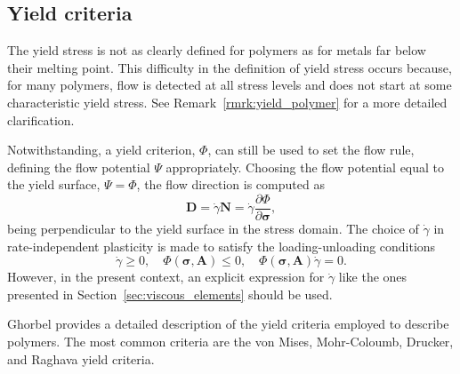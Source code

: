 
\subsection{Yield criteria}
\label{sec:yield_criteria}

The yield stress is not as clearly defined for polymers as for metals far below their melting point.
This difficulty in the definition of yield stress occurs because, for many polymers, flow is detected at all stress levels and does not start at some characteristic yield stress.
See Remark~\ref{rmrk:yield_polymer} for a more detailed clarification.

Notwithstanding, a yield criterion, $\Phi$, can still be used to set the flow rule, defining the flow potential $\Psi$ appropriately.
Choosing the flow potential equal to the yield surface, $\Psi = \Phi$, the flow direction is computed as
\begin{equation}
	\bm D = \dot \gamma \bm N = \dot \gamma \frac{\partial \Phi}{\partial \bm \sigma},
\end{equation}
being perpendicular to the yield surface in the stress domain.
The choice of $\dot \gamma$ in rate-independent plasticity is made to satisfy the loading-unloading conditions
\begin{equation}
	\dot\gamma \geq 0,\quad \Phi(\bm \sigma, \bm A) \leq 0,\quad \Phi(\bm \sigma, \bm A) \dot \gamma = 0.
\end{equation}
However, in the present context, an explicit expression for $\dot \gamma$ like the ones presented in Section~\ref{sec:viscous_elements} should be used.

Ghorbel \citep{ghorbelViscoplasticConstitutiveModel2008} provides a detailed description of the yield criteria employed to describe polymers.
The most common criteria are the von Mises, Mohr-Coloumb, Drucker, and Raghava yield \citep{balieuNonassociatedViscoplasticityCoupled2014} criteria.

%

